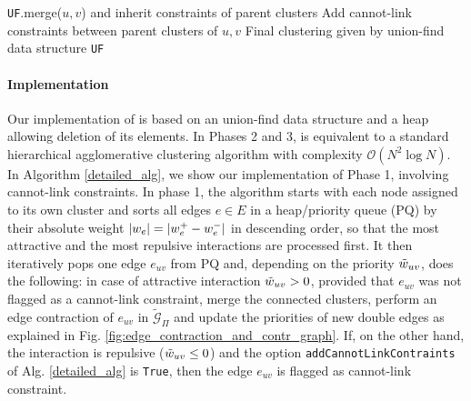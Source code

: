 {\begin{algorithm*}[p]
\begin{algorithmic}[1]
           
              
              \State \texttt{UF}.merge($u,v$) and inherit constraints of parent clusters
              \State Add cannot-link constraints between parent clusters of $u,v$
            \EndIf
          \EndIf
        \EndFor
        \State
        \Return Final clustering given by union-find data structure \texttt{UF}
    \end{algorithmic}
    \label{alg:mutex_watershed}
  \end{algorithm*}
  \clearpage
}

\paragraph{Implementation} Our implementation of \algname{} is based on an union-find data structure and a heap allowing deletion of its elements. 
In Phases 2 and 3, \algname{} is equivalent to a standard hierarchical agglomerative clustering algorithm with complexity $\mathcal{O}(N^2 \log N)$. In Algorithm \ref{detailed_alg}, we show our implementation of Phase 1, involving cannot-link constraints.
In phase 1, the algorithm starts with each node assigned to its own cluster and sorts all edges $e\in E$ in a heap/priority queue (PQ) by their absolute weight $|w_e|=|w_e^+ - w_e^-|$ in descending order, so that the most attractive and the most repulsive interactions are processed first. It then iteratively pops one edge $e_{uv}$ from PQ and, depending on the priority $\tilde{w}_{uv}$, does the following: in case of attractive interaction $\tilde{w}_{uv}>0$, provided that $e_{uv}$ was not flagged as a cannot-link constraint, merge the connected clusters, perform an edge contraction of $e_{uv}$ in $\tilde{\mathcal{G}}_\Pi$ and update the priorities of new double edges as explained in Fig. \ref{fig:edge_contraction_and_contr_graph}. 
If, on the other hand, the interaction is repulsive ($\tilde{w}_{uv}\leq 0$) and the option \texttt{addCannotLinkContraints} of Alg. \ref{detailed_alg} is \texttt{True}, then the edge $e_{uv}$ is flagged as cannot-link constraint.


